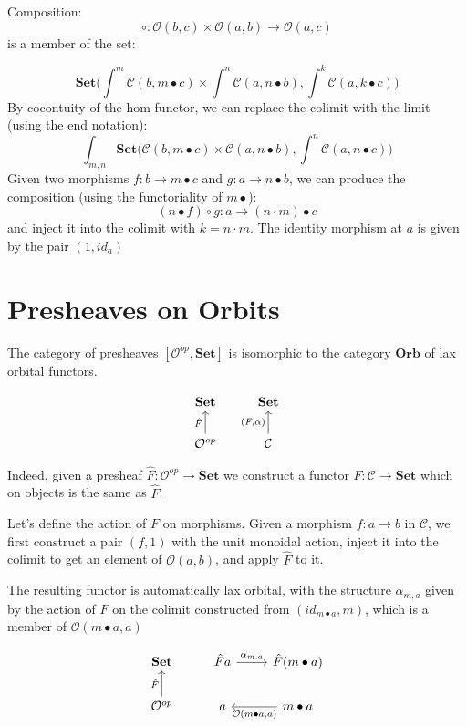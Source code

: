 \documentclass[11pt]{amsart}
\newcommand{\cat}[1]{\mathcal{#1}}%
\newcommand{\Cat}[1]{\mathbf{#1}}%
\newcommand{\Set}{\Cat{Set}}
\begin{document}
Composition: 
\[ \circ \colon \cat O(b, c) \times \cat O(a, b) \to \cat O(a, c) \]
is a member of the set:

\[ \Set \big(\int^m \cat C(b, m \bullet c) \times \int^{n} \cat C(a, n \bullet b) , \int^k \cat C(a, k \bullet c) \big) \]
By cocontuity of the hom-functor, we can replace the colimit with the limit (using the end notation):
\[\int_{m,n}  \Set \big(\cat C(b, m \bullet c) \times \cat C(a, n \bullet b) , \int^n \cat C(a, n \bullet c) \big) \]
Given two morphisms $f \colon b \to m \bullet c $ and $g \colon a \to n \bullet b$, we can produce the composition (using the functoriality of $m \bullet$):
\[ (n \bullet f ) \circ g \colon a \to (n \cdot m) \bullet c \]
and inject it into the colimit with $k = n \cdot m$.
The identity morphism at $a$ is given by the pair $(1, id_a)$

\section{Presheaves on Orbits}

The category of presheaves $[ \cat O^{op}, \Set]$ is isomorphic to the category $\mathbf {Orb}$ of lax orbital functors. 


\[
\begin{tikzcd}
\Set
& \Set
\\ \cat O^{op}
\arrow[u, "\hat F"]
& \cat C
\arrow[u, "{(F, \alpha)}"]
\end{tikzcd}
\]

Indeed, given a presheaf $\hat F: \cat O^{op} \to \Set$ we construct a functor $F \colon \cat C \to \Set$ which on objects is the same as $\hat F$. 

Let's define the action of $F$ on morphisms. Given a morphism $f \colon a \to b$ in $\cat C$, we first construct a pair $(f, 1)$ with the unit monoidal action, inject it into the colimit to get an element of $\cat O (a, b)$, and apply $\hat F$ to it.

The resulting functor is automatically lax orbital, with the structure $\alpha_{m, a}$ given by the action of $\hat F$ on the colimit constructed from $(id_{m \bullet a}, m)$, which is a member of $\cat O(m \bullet a, a)$ 

\[
\begin{tikzcd}
\Set
& \hat F a
\arrow[r, "{\alpha_{m, a}}"]
& \hat F (m \bullet a)
\\ \cat O^{op}
\arrow[u, "\hat F"]
& a
& m \bullet a
\arrow[l, "{\cat O(m \bullet a, a)}"]
\end{tikzcd}
\]
\end{document}
